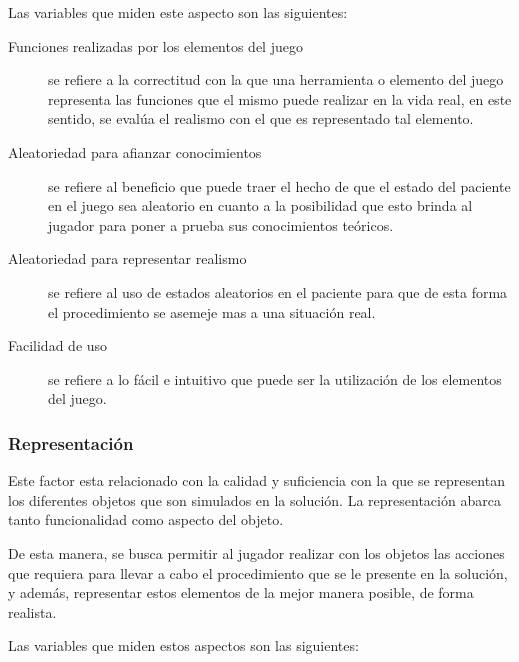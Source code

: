
Las variables que miden este aspecto son las siguientes:

\begin{description}

\item[Funciones realizadas por los elementos del juego] se refiere a la
    correctitud con la que una herramienta o elemento del juego representa las
    funciones que el mismo puede realizar en la vida real, en este sentido, se
    evalúa el realismo con el que es representado tal elemento.

\item[Aleatoriedad para afianzar conocimientos] se refiere al beneficio que
    puede traer el hecho de que el estado del paciente en el juego sea aleatorio
    en cuanto a la posibilidad que esto brinda al jugador para poner a prueba
    sus conocimientos teóricos.

\item[Aleatoriedad para representar realismo] se refiere al uso de estados
    aleatorios en el paciente para que de esta forma el procedimiento se asemeje
    mas a una situación real.

\item[Facilidad de uso] se refiere a lo fácil e intuitivo  que puede ser la
    utilización de los elementos del juego.

\end{description}

\subsubsection{Representación}
\label{sec:sub_representacion}

Este factor esta relacionado con la calidad y suficiencia con la que se
representan los diferentes objetos que son simulados en la solución. La
representación abarca tanto funcionalidad como aspecto del objeto.

De esta manera, se busca permitir al jugador realizar con los objetos las
acciones que requiera para llevar a cabo el procedimiento que se le presente en
la solución, y además, representar estos elementos de la mejor manera posible,
de forma realista.

Las variables que miden estos aspectos son las siguientes:


